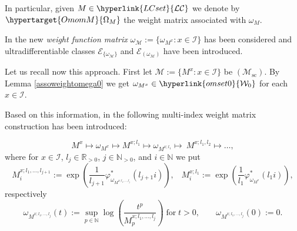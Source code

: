 \documentclass[10pt]{amsart}%
\numberwithin{equation}{section}
\theoremstyle{plain}
\newcommand{\RR}{\mathbb{R}}
\newcommand{\NN}{\mathbb{N}}
\begin{document}
In particular, given  $M\in\hyperlink{LCset}{\mathcal{LC}}$ we denote by $\hypertarget{OmomM}{\Omega_M}$ the weight matrix associated with $\omega_M$.

In \cite[Section 2.7]{testfunctioncharacterization} the new {\itshape weight function matrix} $\omega_{\mathcal{M}}:=\{\omega_{M^x}: x\in\mathcal{I}\}$ has been considered and ultradifferentiable classes $\mathcal{E}_{\{\omega_{\mathcal{M}}\}}$ and $\mathcal{E}_{(\omega_{\mathcal{M}})}$ have been introduced.\vspace{6pt}

Let us recall now this approach. First let $\mathcal{M}:=\{M^x: x\in\mathcal{I}\}$ be \hyperlink{Msc}{$(\mathcal{M}_{\text{sc}})$}. By Lemma \ref{assoweightomega0} we get $\omega_{M^x}\in\hyperlink{omset0}{\mathcal{W}_0}$ for each $x\in\mathcal{I}$.

Based on this information, in \cite[Section 3.1]{testfunctioncharacterization} the following multi-index weight matrix construction has been introduced:

\begin{equation*}%
M^x\mapsto\omega_{M^x}\mapsto M^{x;l_1}\mapsto\omega_{M^{x;l_1}}\mapsto\ M^{x;l_1,l_2}\mapsto\dots,
\end{equation*}
where for $x\in\mathcal{I}$, $l_j\in\RR_{>0}$, $j\in\NN_{>0}$, and $i\in\NN$ we put
\begin{equation*}%
M^{x;l_1,\dots,l_{j+1}}_i:=\exp\left(\frac{1}{l_{j+1}}\varphi^{*}_{\omega_{M^{x;l_1,\dots,l_j}}}(l_{j+1}i)\right),\;\;\; M^{x;l_1}_i:=\exp\left(\frac{1}{l_1}\varphi^{*}_{\omega_{M^x}}(l_1i)\right),
\end{equation*}
respectively
$$\omega_{M^{x;l_1,\dots,l_j}}(t):=\sup_{p\in\NN}\log\left(\frac{t^p}{M_p^{x;l_1,\dots,l_j}}\right)\;\text{for}\;t>0,\;\hspace{20pt}\omega_{M^{x;l_1,\dots,l_j}}(0):=0.$$
\end{document}
